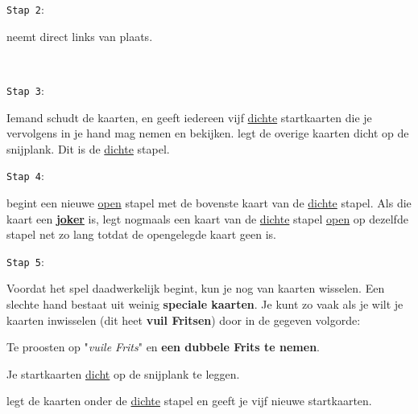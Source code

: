\noindent
\begin{minipage}[t]{.09\textwidth}
\texttt{Stap 2}:
\end{minipage}
\hfill
\begin{minipage}[t]{.91\textwidth}
\Willem neemt direct links van \Frits plaats. 
\end{minipage}
\\

\noindent
\begin{minipage}[t]{.09\textwidth}
\texttt{Stap 3}:
\end{minipage}
\hfill
\begin{minipage}[t]{.91\textwidth}
Iemand schudt de kaarten, en \Frits geeft iedereen vijf \ul{dichte} startkaarten die je vervolgens in je hand mag nemen en bekijken. \Frits legt de overige kaarten dicht op de snijplank. Dit is de \ul{dichte} stapel. \\
\end{minipage}

\noindent
\begin{minipage}[t]{.09\textwidth}
\texttt{Stap 4}:
\end{minipage}
\hfill
\begin{minipage}[t]{.91\textwidth}
\Frits begint een nieuwe \ul{open} stapel met de bovenste kaart van de \ul{dichte} stapel. Als die kaart een \textbf{\ul{joker}} is, legt \Frits nogmaals een kaart van de \ul{dichte} stapel \ul{open} op dezelfde stapel net zo lang totdat de opengelegde kaart geen  is.
\end{minipage}

\vspace*{+0.35cm} 

\noindent
\begin{minipage}[t]{.09\textwidth}
\texttt{Stap 5}:
\end{minipage}
\hfill
\begin{minipage}[t]{.91\textwidth}
Voordat het spel daadwerkelijk begint, kun je nog van kaarten wisselen. Een slechte hand bestaat uit weinig \textbf{speciale kaarten}. Je kunt zo vaak als je wilt je kaarten inwisselen (dit heet \textbf{vuil Fritsen}) door in de gegeven volgorde:
\numeriekeLijst{}
    \item Te proosten op "\textit{vuile Frits}" en \textbf{een dubbele Frits te nemen}.
    \item Je startkaarten \ul{dicht} op de snijplank te leggen.
    \item \Frits legt de kaarten onder de \ul{dichte} stapel en geeft je vijf nieuwe startkaarten.
\eindNumeriekeLijst{}
\end{minipage}
\vspace*{+0.3cm} 
    
